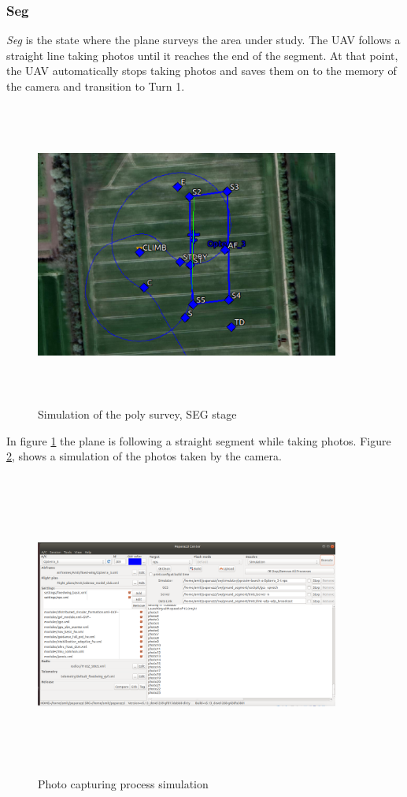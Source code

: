 \subsubsection{Seg}
\textit{Seg} is the state where the plane surveys the area under study. The UAV follows a straight line taking photos until it reaches the end of the segment. At that point, the UAV automatically stops taking photos and saves them on to the memory of the camera and transition to Turn 1.
\begin{figure}[H]
\centering
\includegraphics[width=10cm,height=10cm,keepaspectratio]{imagenes/SEG.png}
\caption{Simulation of the poly survey, SEG stage}
\label{fig:SEG_stage}
\end{figure}

In figure \ref{fig:SEG_stage} the plane is following a straight segment while taking photos. Figure \ref{fig:Photos}, shows a simulation of the photos taken by the camera.
\begin{figure}[H]
\centering
\includegraphics[width=10cm,height=10cm,keepaspectratio]{imagenes/Photos.png}
\caption{Photo capturing process simulation}
\label{fig:Photos}
\end{figure}

